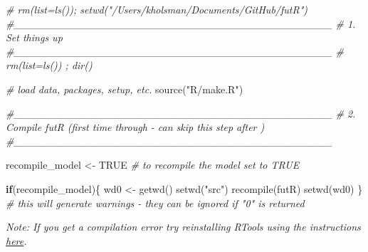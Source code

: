 \documentclass[
]{article}
\newenvironment{Shaded}{\begin{snugshade}}{\end{snugshade}}
\newcommand{\CommentTok}[1]{\textcolor[rgb]{0.56,0.35,0.01}{\textit{#1}}}
\newcommand{\ConstantTok}[1]{\textcolor[rgb]{0.00,0.00,0.00}{#1}}
\newcommand{\ControlFlowTok}[1]{\textcolor[rgb]{0.13,0.29,0.53}{\textbf{#1}}}
\newcommand{\FunctionTok}[1]{\textcolor[rgb]{0.00,0.00,0.00}{#1}}
\newcommand{\NormalTok}[1]{#1}
\newcommand{\OtherTok}[1]{\textcolor[rgb]{0.56,0.35,0.01}{#1}}
\newcommand{\StringTok}[1]{\textcolor[rgb]{0.31,0.60,0.02}{#1}}
\begin{document}
\begin{Shaded}
\begin{Highlighting}[]
  \CommentTok{\# rm(list=ls()); setwd("/Users/kholsman/Documents/GitHub/futR")}
  \CommentTok{\#\_\_\_\_\_\_\_\_\_\_\_\_\_\_\_\_\_\_\_\_\_\_\_\_\_\_\_\_\_\_\_\_\_\_\_\_\_\_\_\_\_\_\_}
  \CommentTok{\# 1. Set things up}
  \CommentTok{\#\_\_\_\_\_\_\_\_\_\_\_\_\_\_\_\_\_\_\_\_\_\_\_\_\_\_\_\_\_\_\_\_\_\_\_\_\_\_\_\_\_\_\_}
  \CommentTok{\# rm(list=ls()) ; dir()}

  \CommentTok{\# load data, packages, setup, etc.}
  \FunctionTok{source}\NormalTok{(}\StringTok{"R/make.R"}\NormalTok{)}

  \CommentTok{\#\_\_\_\_\_\_\_\_\_\_\_\_\_\_\_\_\_\_\_\_\_\_\_\_\_\_\_\_\_\_\_\_\_\_\_\_\_\_\_\_\_\_\_}
  \CommentTok{\# 2. Compile futR (first time through {-} can skip this step after )}
  \CommentTok{\#\_\_\_\_\_\_\_\_\_\_\_\_\_\_\_\_\_\_\_\_\_\_\_\_\_\_\_\_\_\_\_\_\_\_\_\_\_\_\_\_\_\_\_}

\NormalTok{  recompile\_model }\OtherTok{\textless{}{-}} \ConstantTok{TRUE} \CommentTok{\# to recompile the model set to TRUE}

   \ControlFlowTok{if}\NormalTok{(recompile\_model)\{}
\NormalTok{    wd0 }\OtherTok{\textless{}{-}} \FunctionTok{getwd}\NormalTok{()}
    \FunctionTok{setwd}\NormalTok{(}\StringTok{"src"}\NormalTok{)}
      \FunctionTok{recompile}\NormalTok{(}\StringTok{\textquotesingle{}futR\textquotesingle{}}\NormalTok{)}
    \FunctionTok{setwd}\NormalTok{(wd0)}
\NormalTok{   \}}
  \CommentTok{\# this will generate warnings {-} they can be ignored if "0" is returned}
\end{Highlighting}
\end{Shaded}

\emph{Note: If you get a compilation error try reinstalling RTools using
the instructions
\href{https://cran.r-project.org/bin/windows/Rtools/}{here}.}
\end{document}
